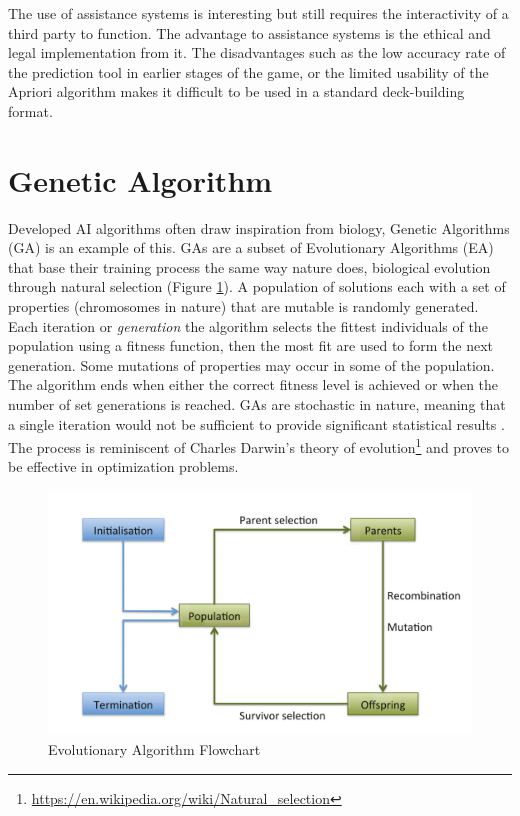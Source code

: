 \documentclass{report} %
\begin{document}
The use of assistance systems is interesting but still requires the interactivity of a third party to function. The advantage to assistance systems is the ethical and legal implementation from it. The disadvantages such as the low accuracy rate of the prediction tool in earlier stages of the game, or the limited usability of the Apriori algorithm makes it difficult to be used in a standard deck-building format.

\section{Genetic Algorithm}
Developed AI algorithms often draw inspiration from biology\cite{Eiben2015}, Genetic Algorithms (GA) is an example of this. GAs are a subset of Evolutionary Algorithms (EA) that base their training process the same way nature does, biological evolution through natural selection (Figure \ref{ea}).  A population of solutions each with a set of properties (chromosomes in nature) that are mutable is randomly generated. Each iteration or \textit{generation} the algorithm selects the fittest individuals of the population using a fitness function, then the most fit are used to form the next generation. Some mutations of properties may occur in some of the population. The algorithm ends when either the correct fitness level is achieved or when the number of set generations is reached\cite{Whitley1994}. GAs are stochastic in nature, meaning that a single iteration would not be sufficient to provide significant statistical results \cite{Merelo2015}. The process is reminiscent of Charles Darwin's theory of evolution\footnote{\url{https://en.wikipedia.org/wiki/Natural_selection}} and proves to be effective in optimization problems\cite{Eiben2015}.  \begin{figure}[h]
\centering
\includegraphics[width=1\textwidth]{EAFlowchart}
\caption{Evolutionary Algorithm Flowchart \cite{Eiben2015}  }
\label{ea}
\end{figure}
\end{document}

